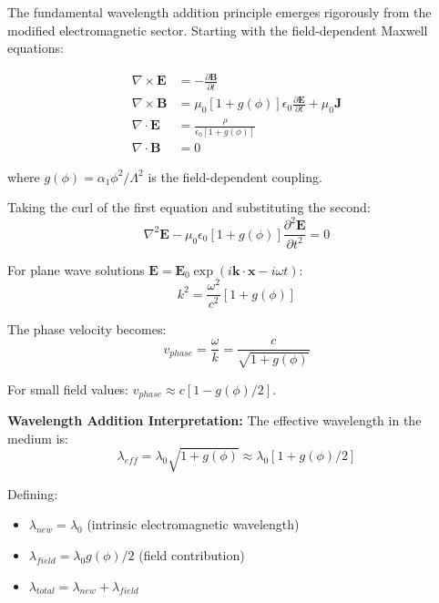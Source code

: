 \documentclass[10pt,twocolumn]{article}
\begin{document}
The fundamental wavelength addition principle emerges rigorously from the modified electromagnetic sector. Starting with the field-dependent Maxwell equations:

\begin{align}
\nabla \times \mathbf{E} &= -\frac{\partial \mathbf{B}}{\partial t}\\
\nabla \times \mathbf{B} &= \mu_0\left[1 + g(\phi)\right]\epsilon_0 \frac{\partial \mathbf{E}}{\partial t} + \mu_0 \mathbf{J}\\
\nabla \cdot \mathbf{E} &= \frac{\rho}{\epsilon_0[1 + g(\phi)]}\\
\nabla \cdot \mathbf{B} &= 0
\end{align}

where $g(\phi) = \alpha_1 \phi^2/\Lambda^2$ is the field-dependent coupling.

Taking the curl of the first equation and substituting the second:
\begin{equation}
\nabla^2\mathbf{E} - \mu_0\epsilon_0[1 + g(\phi)] \frac{\partial^2\mathbf{E}}{\partial t^2} = 0
\end{equation}

For plane wave solutions $\mathbf{E} = \mathbf{E}_0 \exp(i\mathbf{k} \cdot \mathbf{x} - i\omega t)$:
\begin{equation}
k^2 = \frac{\omega^2}{c^2}[1 + g(\phi)]
\end{equation}

The phase velocity becomes:
\begin{equation}
v_{phase} = \frac{\omega}{k} = \frac{c}{\sqrt{1 + g(\phi)}}
\end{equation}

For small field values: $v_{phase} \approx c[1 - g(\phi)/2]$.

\textbf{Wavelength Addition Interpretation:}
The effective wavelength in the medium is:
\begin{equation}
\lambda_{eff} = \lambda_0 \sqrt{1 + g(\phi)} \approx \lambda_0[1 + g(\phi)/2]
\end{equation}

Defining:
\begin{itemize}
\item $\lambda_{new} = \lambda_0$ (intrinsic electromagnetic wavelength)
\item $\lambda_{field} = \lambda_0 g(\phi)/2$ (field contribution)
\item $\lambda_{total} = \lambda_{new} + \lambda_{field}$
\end{itemize}
\end{document}
